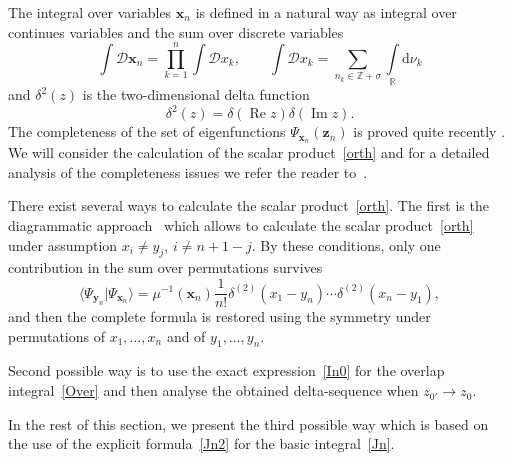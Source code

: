 \documentclass[10pt,a4paper]{amsart}
\renewcommand{\Re}{\operatorname{Re}}
\renewcommand{\Im}{\operatorname{Im}}
\numberwithin{equation}{section}
\begin{document}
The integral over variables $\bm{x}_n$ is defined in a natural way
as integral over continues variables and the sum over discrete variables
\begin{equation}\label{sumint}
	\int \mathcal{D}\bm{x}_n = \prod\limits_{k=1}^{n}\int\mathcal{D}x_k,\qquad 	\int\mathcal{D}x_k = \sum\limits_{n_k\in\mathbb{Z}+\sigma}\int\limits_{\mathbb{R}}\mathrm{d}\nu_k
\end{equation}
and $\delta^2(z)$ is the two-dimensional delta function
\begin{equation*}
	\delta^2(z) = \delta(\Re z) \delta(\Im z) .
\end{equation*}
The completeness of the set of eigenfunctions $\Psi_{\bm{x}_n}(\bm{z}_n)$ is proved quite recently \cite{M}. We will consider the calculation of the scalar product~\eqref{orth} and for a detailed analysis of the completeness issues we refer the reader to~\cite{M}.

There exist several ways to calculate the scalar product~\eqref{orth}.
The first is the diagrammatic approach~\cite{DM2} which allows to calculate
the scalar product~\eqref{orth} under assumption $x_i \neq y_j$, ${i\neq n+1-j}$.
By these conditions, only one contribution in the sum over permutations%
survives
\begin{equation*}
	\langle \Psi_{\bm{y}_n} | \Psi_{\bm{x}_n} \rangle =
	\mu^{-1}(\bm{x}_n) \frac{1}{n!} \delta^{(2)}(x_1-y_n) \cdots \delta^{(2)}(x_n-y_1),
\end{equation*}
and then the complete formula is restored using the symmetry under permutations of $x_1,\dots,x_n$ and of $y_1, \dots, y_n$.

Second possible way is to use the exact expression~\eqref{In0} for the overlap integral~\eqref{Over} and then analyse the obtained delta-sequence when $z_{0'} \to z_{0}$.

In the rest of this section, we present the third possible way which
is based on the use of the explicit formula~\eqref{Jn2} for the basic
integral~\eqref{Jn}.
\end{document}
